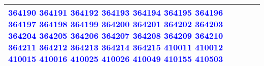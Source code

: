 {\begin{tabular}{|l|p{10cm}|}
\textcolor{blue}{364190} \textcolor{blue}{364191} \textcolor{blue}{364192} \textcolor{blue}{364193} \textcolor{blue}{364194} \textcolor{blue}{364195} \textcolor{blue}{364196} \textcolor{blue}{364197} \textcolor{blue}{364198} \textcolor{blue}{364199} \textcolor{blue}{364200} \textcolor{blue}{364201} \textcolor{blue}{364202} \textcolor{blue}{364203} \textcolor{blue}{364204} \textcolor{blue}{364205} \textcolor{blue}{364206} \textcolor{blue}{364207} \textcolor{blue}{364208} \textcolor{blue}{364209} \textcolor{blue}{364210} \textcolor{blue}{364211} \textcolor{blue}{364212} \textcolor{blue}{364213} \textcolor{blue}{364214} \textcolor{blue}{364215} \textcolor{blue}{410011} \textcolor{blue}{410012} \textcolor{blue}{410015} \textcolor{blue}{410016} \textcolor{blue}{410025} \textcolor{blue}{410026} \textcolor{blue}{410049} \textcolor{blue}{410155} \textcolor{blue}{410503} \\
\hline
\end{tabular}}
